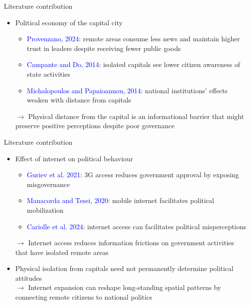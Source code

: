 \documentclass[10pt]{beamer}
\begin{document}
\begin{frame}{Literature contribution}
    \begin{itemize}\setlength\itemsep{1em}

        \item Political economy of the capital city
        \begin{itemize}\setlength\itemsep{1em}

            \item \textcolor{blue}{Provenzano, 2024}: remote areas consume less news and maintain higher trust in leaders despite receiving fewer public goods
            \item \textcolor{blue}{Campante and Do, 2014}: isolated capitals see lower citizen awareness of state activities
            \item \textcolor{blue}{Michalopoulos and Papaioannou, 2014}: national institutions' effects weaken with distance from capitals
        \end{itemize}
        $\rightarrow$ \textcolor{rougeprez}{Physical distance from the capital is an informational
        barrier that might preserve positive perceptions despite poor governance}
    \end{itemize}
\end{frame}


\begin{frame}{Literature contribution}
\begin{itemize}\setlength\itemsep{1em}

    \item Effect of internet on political behaviour
    \begin{itemize}\setlength\itemsep{1em}

        \item \textcolor{blue}{Guriev et al. 2021}: 3G access reduces government approval by exposing misgovernance
        \item \textcolor{blue}{Manacorda and Tesei, 2020}: mobile internet facilitates political mobilization
        \item \textcolor{blue}{Cariolle et al. 2024}: internet access can facilitates political misperceptions
    \end{itemize}
    $\rightarrow$ \textcolor{rougeprez}{Internet access reduces information frictions on government activities that have isolated remote areas}
    \item Physical isolation from capitals need not permanently determine political attitudes\\
    $\rightarrow$ Internet expansion can reshape long-standing spatial patterns by connecting remote citizens to national politics
\end{itemize}

\end{frame}
\end{document}
